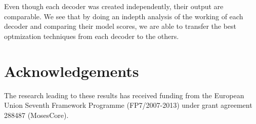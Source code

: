 \documentclass{pbml}
\begin{document}
Even though each decoder was created independently, their output are comparable. We see that by doing an indepth analysis of the working of each decoder and comparing their model scores, we are able to transfer the best optmization techniques from each decoder to the others.


\section*{Acknowledgements}

The research leading to these results has received funding from the European Union Seventh Framework Programme (FP7/2007-2013) under grant agreement 288487 (MosesCore).




\correspondingaddress
\end{document}

